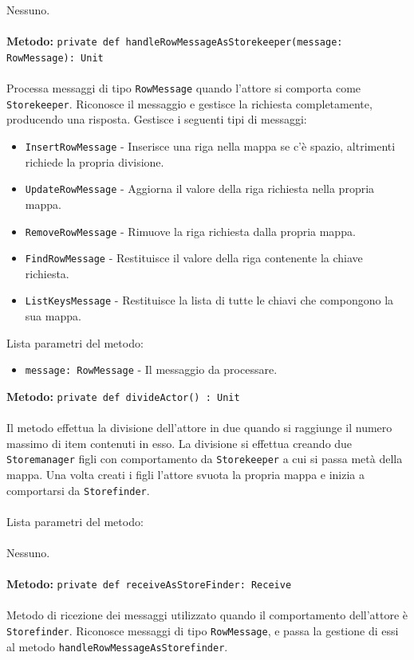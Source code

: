 \documentclass[a4paper]{article}
\begin{document}
			Nessuno.
			\\ \\
		\textbf{Metodo: }\texttt{private def handleRowMessageAsStorekeeper(message: RowMessage): Unit}
			\\ \\
			Processa messaggi di tipo \texttt{RowMessage} quando l'attore si comporta come \texttt{Storekeeper}. Riconosce il messaggio e gestisce la richiesta completamente, producendo una risposta.
			Gestisce i seguenti tipi di messaggi:
			\begin{itemize}
				\item \texttt{InsertRowMessage} - Inserisce una riga nella mappa se c'è spazio, altrimenti richiede la propria divisione.
				\item \texttt{UpdateRowMessage} - Aggiorna il valore della riga richiesta nella propria mappa.
				\item \texttt{RemoveRowMessage} - Rimuove la riga richiesta dalla propria mappa.
				\item \texttt{FindRowMessage} - Restituisce il valore della riga contenente la chiave richiesta.
				\item \texttt{ListKeysMessage} - Restituisce la lista di tutte le chiavi che compongono la sua mappa.
			\end{itemize}
			Lista parametri del metodo:
			\begin{itemize}
				\item \texttt{message: RowMessage} - Il messaggio da processare.
			\end{itemize}
		\textbf{Metodo: }\texttt{private def divideActor() : Unit}
			\\ \\
				Il metodo effettua la divisione dell'attore in due quando si raggiunge il numero massimo di item contenuti in esso. La divisione si effettua creando due \texttt{Storemanager} figli con comportamento da \texttt{Storekeeper} a cui si passa metà della mappa. Una volta creati i figli l'attore svuota la propria mappa e inizia a comportarsi da \texttt{Storefinder}.
			\\ \\
			Lista parametri del metodo:
			\\ \\
				Nessuno. 
			\\ \\
		\textbf{Metodo: }\texttt{private def receiveAsStoreFinder: Receive}
			\\ \\
			Metodo di ricezione dei messaggi utilizzato quando il comportamento dell'attore è \texttt{Storefinder}. Riconosce messaggi di tipo \texttt{RowMessage}, e passa la gestione di essi al metodo \texttt{handleRowMessageAsStorefinder}.
\end{document}
